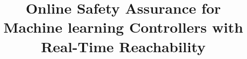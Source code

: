 \documentclass[manuscript,screen,review]{acmart}
\begin{document}
\title{Online Safety Assurance for Machine learning Controllers with Real-Time Reachability}









\renewcommand{\shortauthors}{}
\end{document}
